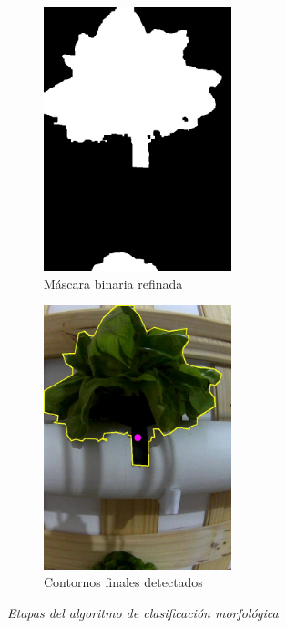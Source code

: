 \begin{figure}[H]
\vspace{0.3cm}

\begin{subfigure}[b]{0.48\textwidth}
    \centering
    \includegraphics[width=0.6\textwidth]{imagenes/clasificador_5_binario_final.jpg}
    \caption{Máscara binaria refinada}
\end{subfigure}
\hfill
\begin{subfigure}[b]{0.48\textwidth}
    \centering
    \includegraphics[width=0.6\textwidth]{imagenes/clasificador_6_contornos.jpg}
    \caption{Contornos finales detectados}
\end{subfigure}

\caption{\textit{Etapas del algoritmo de clasificación morfológica}}
\label{fig:clasificador_etapa2}
\end{figure}

